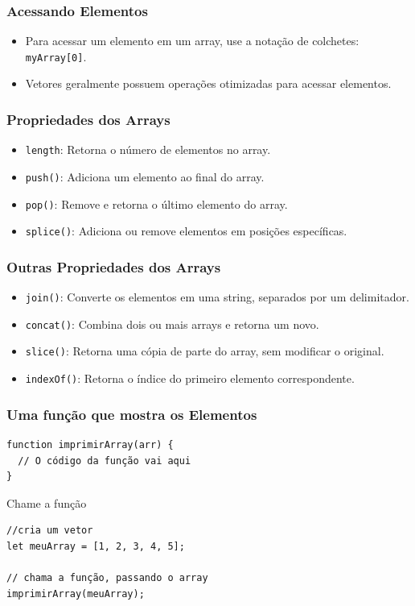 \documentclass[13pt, xcolor={dvipsnames,svgnames}, portuguese]{beamer}
\begin{document}
\begin{frame}
\frametitle{Acessando Elementos}
\begin{itemize}
  \item<1-> Para acessar um elemento em um array, use a notação de colchetes: \texttt{myArray[0]}.
  \item<2-> Vetores geralmente possuem operações otimizadas para acessar elementos.
\end{itemize}
\end{frame}

\begin{frame}
\frametitle{Propriedades dos Arrays}
\begin{itemize}
  \item<1-> \texttt{length}: Retorna o número de elementos no array.
  \item<2-> \texttt{push()}: Adiciona um elemento ao final do array.
  \item<3-> \texttt{pop()}: Remove e retorna o último elemento do array.
  \item<4-> \texttt{splice()}: Adiciona ou remove elementos em posições específicas.
\end{itemize}
\end{frame}

\begin{frame}
\frametitle{Outras Propriedades dos Arrays}
\begin{itemize}
  \item<1-> \texttt{join()}: Converte os elementos em uma string, separados por um delimitador.
  \item<2-> \texttt{concat()}: Combina dois ou mais arrays e retorna um novo.
  \item<3-> \texttt{slice()}: Retorna uma cópia de parte do array, sem modificar o original.
  \item<4-> \texttt{indexOf()}: Retorna o índice do primeiro elemento correspondente.
\end{itemize}
\end{frame}

\begin{frame}[fragile]
\frametitle{Uma função que mostra os Elementos}
\begin{verbatim}
function imprimirArray(arr) {
  // O código da função vai aqui
}
\end{verbatim}
Chame a função
\begin{verbatim}
//cria um vetor
let meuArray = [1, 2, 3, 4, 5];

// chama a função, passando o array
imprimirArray(meuArray);

\end{verbatim}

\end{frame}
\end{document}
